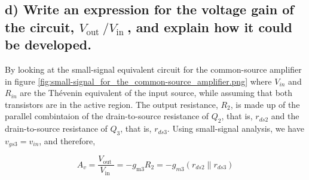\subsection*{d) Write an expression for the voltage gain of the circuit, $V_{\text {out }} / V_{\text {in }}$, and explain how it could be developed.}

By looking at the small-signal equivalent circuit for the common-source amplifier in figure \ref{fig:small-signal_for_the_common-source_amplifier.png} where $V_{in}$ and $R_{in}$ are the Thévenin equivalent of the input source, while assuming that both transistors are in the active region. The output resistance, $R_2$, is made up of the parallel combintaion of the drain-to-source resistance of $Q_2$, that is, $r_{ds2}$ and the drain-to-source resistance of $Q_3$, that is, $r_{ds3}$. Using small-signal analysis, we have $v_{gs3}=v_{in}$, and therefore,

\[A_v=\frac{V_{\text {out }}}{V_{\text {in }}}=-g_{\mathrm{m} 3} R_2=-g_{m 3}\left(r_{d s 2} \| r_{d s 3}\right)\]



